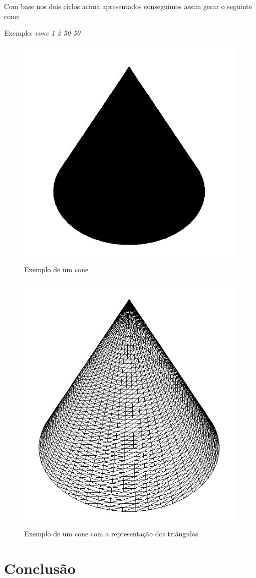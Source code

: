 \documentclass{article}
\begin{document}
Com base nos dois ciclos acima apresentados conseguimos assim gerar o seguinte cone:

Exemplo: \textit{cone 1 2 50 50}
\begin{figure}[H]
\centering\includegraphics[scale=0.45]{coneP} 
\caption{\label{fig:controller}Exemplo de um cone}
\end{figure} \begin{figure}[H]
\centering\includegraphics[scale=0.4]{coneT} 
\caption{\label{fig:controller}Exemplo de um cone com a representação dos triângulos}
\end{figure}
\newpage
\section{Conclusão}
\end{document}
